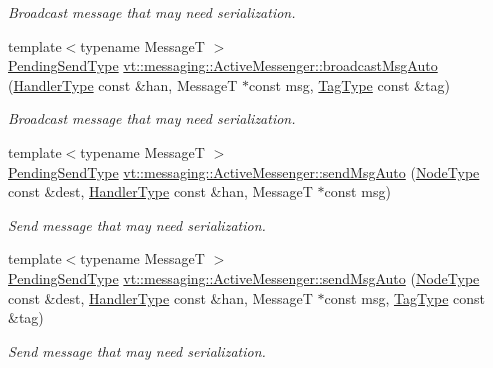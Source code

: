 \begin{DoxyCompactItemize}
\begin{DoxyCompactList}\small\item\em Broadcast message that may need serialization. \end{DoxyCompactList}\item 
{\footnotesize template$<$typename MessageT $>$ }\\\hyperlink{structvt_1_1messaging_1_1_active_messenger_a3626a6ca76d8ad4ec7c3b47a2c70d3a8}{Pending\+Send\+Type} \hyperlink{group__preregister_gad5dda6ea8eb86471347572ec0ee0b26a}{vt\+::messaging\+::\+Active\+Messenger\+::broadcast\+Msg\+Auto} (\hyperlink{namespacevt_af64846b57dfcaf104da3ef6967917573}{Handler\+Type} const \&han, MessageT $\ast$const msg, \hyperlink{namespacevt_a84ab281dae04a52a4b243d6bf62d0e52}{Tag\+Type} const \&tag)
\begin{DoxyCompactList}\small\item\em Broadcast message that may need serialization. \end{DoxyCompactList}\item 
{\footnotesize template$<$typename MessageT $>$ }\\\hyperlink{structvt_1_1messaging_1_1_active_messenger_a3626a6ca76d8ad4ec7c3b47a2c70d3a8}{Pending\+Send\+Type} \hyperlink{group__preregister_ga3453709452e704b60bc41a13ec7b0b4e}{vt\+::messaging\+::\+Active\+Messenger\+::send\+Msg\+Auto} (\hyperlink{namespacevt_a866da9d0efc19c0a1ce79e9e492f47e2}{Node\+Type} const \&dest, \hyperlink{namespacevt_af64846b57dfcaf104da3ef6967917573}{Handler\+Type} const \&han, MessageT $\ast$const msg)
\begin{DoxyCompactList}\small\item\em Send message that may need serialization. \end{DoxyCompactList}\item 
{\footnotesize template$<$typename MessageT $>$ }\\\hyperlink{structvt_1_1messaging_1_1_active_messenger_a3626a6ca76d8ad4ec7c3b47a2c70d3a8}{Pending\+Send\+Type} \hyperlink{group__preregister_gab6320b24ec0e640634b5394691ea9819}{vt\+::messaging\+::\+Active\+Messenger\+::send\+Msg\+Auto} (\hyperlink{namespacevt_a866da9d0efc19c0a1ce79e9e492f47e2}{Node\+Type} const \&dest, \hyperlink{namespacevt_af64846b57dfcaf104da3ef6967917573}{Handler\+Type} const \&han, MessageT $\ast$const msg, \hyperlink{namespacevt_a84ab281dae04a52a4b243d6bf62d0e52}{Tag\+Type} const \&tag)
\begin{DoxyCompactList}\small\item\em Send message that may need serialization. \end{DoxyCompactList}\end{DoxyCompactItemize}


